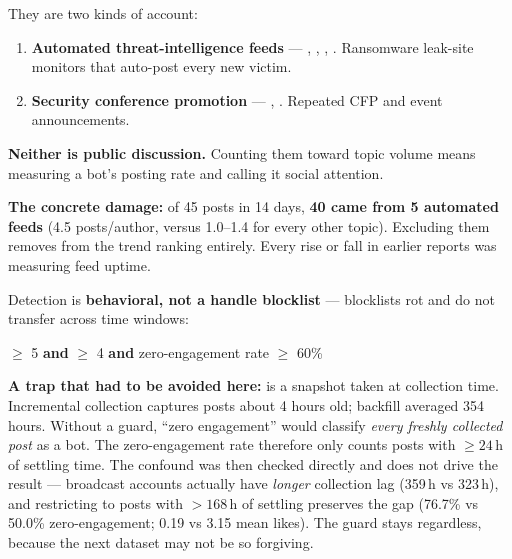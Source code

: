 \documentclass[11pt]{article}
\begin{document}
They are two kinds of account:

\begin{enumerate}[leftmargin=1.6em,itemsep=0.2em]
\item \textbf{Automated threat-intelligence feeds} --- ,
  , ,
  . Ransomware leak-site monitors that auto-post
  every new victim.
\item \textbf{Security conference promotion} --- ,
  . Repeated CFP and event announcements.
\end{enumerate}

\textbf{Neither is public discussion.} Counting them toward topic volume means
measuring a bot's posting rate and calling it social attention.

\begin{keybox}
\textbf{The concrete damage:} of 45  posts in 14 days,
\textbf{40 came from 5 automated feeds} (4.5 posts/author, versus 1.0--1.4 for
every other topic). Excluding them removes  from the trend
ranking entirely. Every  rise or fall in earlier reports was
measuring feed uptime.
\end{keybox}

Detection is \textbf{behavioral, not a handle blocklist} --- blocklists rot and
do not transfer across time windows:

\begin{center}
 $\geq$ 5 \quad\textbf{and}\quad
{} $\geq$ 4 \quad\textbf{and}\quad
zero-engagement rate $\geq$ 60\%
\end{center}

\textbf{A trap that had to be avoided here:}  is a snapshot
taken at collection time. Incremental collection captures posts about 4 hours
old; backfill averaged 354 hours. Without a guard, ``zero engagement'' would
classify \emph{every freshly collected post} as a bot. The zero-engagement rate
therefore only counts posts with $\geq 24$\,h of settling time. The confound was
then checked directly and does not drive the result --- broadcast accounts
actually have \emph{longer} collection lag (359\,h vs 323\,h), and restricting
to posts with $>168$\,h of settling preserves the gap (76.7\% vs 50.0\%
zero-engagement; 0.19 vs 3.15 mean likes). The guard stays regardless, because
the next dataset may not be so forgiving.
\end{document}

